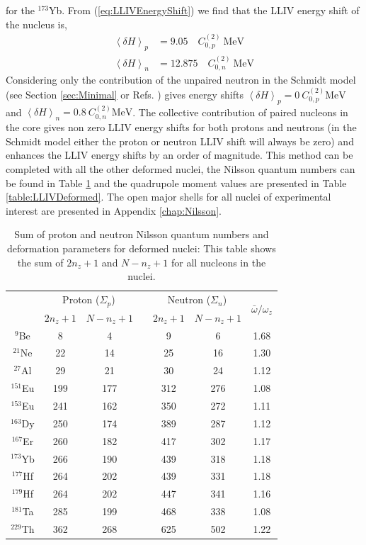 \documentclass[10pt,a4paper, twoside, openright]{report}
\begin{document}
for the $^{173}$Yb. 
From (\ref{eq:LLIVEnergyShift}) we find that the LLIV energy shift of the nucleus is,
\begin{align*}
\left<\delta H\right>_{p} &= 9.05 \quad C^{(2)}_{0,p} \ \text{MeV} \\
\left<\delta H\right>_n &=  12.875 \quad C^{(2)}_{0,n} \ \text{MeV}
\end{align*}
Considering only the contribution of the unpaired neutron in the Schmidt model (see Section \ref{sec:Minimal} or Refs. \cite{Kostelecky1999,Flambaum2016}) gives energy shifts $\left<\delta H\right>_{p} = 0 \ C^{(2)}_{0,p} \text{MeV}$ and $\left<\delta H\right>_n = 0.8 \ C^{(2)}_{0,n} \text{MeV}$. The collective contribution of paired nucleons in the core gives non zero LLIV energy shifts for both protons and neutrons (in the Schmidt model either the proton or neutron LLIV shift will always be zero) and enhances the LLIV energy shifts by an order of magnitude. This method can be completed with all the other deformed nuclei, the Nilsson quantum numbers can be found in Table \ref{table:NzNumbers} and the quadrupole moment values are presented in Table \ref{table:LLIVDeformed}. The open major shells for all nuclei of experimental interest are presented in Appendix \ref{chap:Nilsson}.\\
\linebreak
\begin{table}[h!]
\centering
\caption[Deformation parameters for deformed nuclei of interest.]{Sum of proton and neutron Nilsson quantum numbers and deformation parameters for deformed nuclei: This table shows the sum of $2n_z + 1$ and $N - n_z + 1$ for all nucleons in the nuclei.}
\begin{tabular}{ccccccc}
\toprule
\toprule
 & \multicolumn{2}{c}{Proton ($\Sigma_p$)} & & \multicolumn{2}{c}{Neutron ($\Sigma_n$)} & \multirow{2}{*}{$\bar{\omega}/\omega_z$} \\
\cline{2-3} \cline{5-6}
 & $2n_z + 1$ & $N - n_z + 1$ & & $2n_z + 1$ & $N - n_z + 1$ &  \\
\midrule
$^{9}$Be   & 8   & 4  & & 9   & 6   & 1.68\\
$^{21}$Ne  & 22  & 14 & & 25  & 16  & 1.30\\
$^{27}$Al  & 29  & 21  &  & 30  & 24  & 1.12\\
$^{151}$Eu & 199 & 177 & & 312 & 276 & 1.08\\
$^{153}$Eu & 241 & 162 & & 350 & 272 & 1.11\\
$^{163}$Dy & 250 & 174 & & 389 & 287 & 1.12\\
$^{167}$Er & 260 & 182 & & 417 & 302 & 1.17\\
$^{173}$Yb & 266 & 190 & & 439 & 318 & 1.18\\
$^{177}$Hf & 264 & 202 & & 439 & 331 & 1.18\\
$^{179}$Hf & 264 & 202 & & 447 & 341 & 1.16\\
$^{181}$Ta & 285 & 199 & & 468 & 338 & 1.08\\
$^{229}$Th & 362 & 268 & & 625 & 502 & 1.22\\
\bottomrule
\bottomrule
\end{tabular}

\label{table:NzNumbers}
\end{table}
\end{document}

